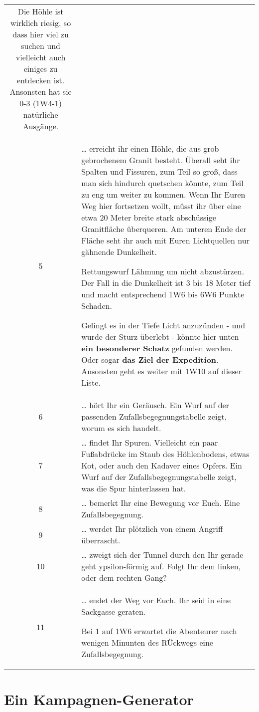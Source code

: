 \begin{tabularx}{\columnwidth}{cZ}
  Die Höhle ist wirklich riesig, so dass hier viel zu suchen und
  vielleicht auch einiges zu entdecken ist. Ansonsten hat sie 0-3
  (1W4-1) natürliche Ausgänge.
\\
5 & 
  \ldots{} erreicht ihr einen Höhle, die aus grob gebrochenem Granit
  besteht. Überall seht ihr Spalten und Fissuren, zum Teil so groß, dass
  man sich hindurch quetschen könnte, zum Teil zu eng um weiter zu
  kommen. Wenn Ihr Euren Weg hier fortsetzen wollt, müsst ihr über eine
  etwa 20 Meter breite stark abschüssige Granitfläche überqueren. Am
  unteren Ende der Fläche seht ihr auch mit Euren Lichtquellen nur
  gähnende Dunkelheit.

  Rettungswurf Lähmung um nicht abzustürzen. Der Fall in die Dunkelheit
  ist 3 bis 18 Meter tief und macht entsprechend 1W6 bis 6W6 Punkte
  Schaden.

  Gelingt es in der Tiefe Licht anzuzünden - und wurde der Sturz
  überlebt - könnte hier unten \textbf{ein besonderer Schatz} gefunden
  werden. Oder sogar \textbf{das Ziel der Expedition}. Ansonsten geht es
  weiter mit 1W10 auf dieser Liste.
\\
6 & 
  \ldots{} hört Ihr ein Geräusch. Ein Wurf auf der passenden
  Zufallsbegegnungstabelle zeigt, worum es sich handelt.
\\
7 & 
  \ldots{} findet Ihr Spuren. Vielleicht ein paar Fußabdrücke im Staub
  des Höhlenbodens, etwas Kot, oder auch den Kadaver eines Opfers. Ein
  Wurf auf der Zufallsbegegnungstabelle zeigt, was die Spur hinterlassen
  hat.
\\
8 & 
  \ldots{} bemerkt Ihr eine Bewegung vor Euch. Eine Zufallsbegegnung.
\\
9 & 
  \ldots{} werdet Ihr plötzlich von einem Angriff überrascht.
\\
10 & 
  \ldots{} zweigt sich der Tunnel durch den Ihr gerade geht
  ypsilon-förmig auf. Folgt Ihr dem linken, oder dem rechten Gang?
\\
11 & 
  \ldots{} endet der Weg vor Euch. Ihr seid in eine Sackgasse geraten.

  Bei 1 auf 1W6 erwartet die Abenteurer nach wenigen Minunten des
  RÜckwegs eine Zufallsbegegnung. \\

\end{tabularx}

\section{Ein Kampagnen-Generator}

